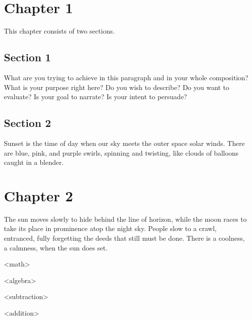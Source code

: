 \chapter{Chapter 1}
\label{chapter:1}
This chapter consists of two sections.

\section{Section 1}
\label{section:1}

What are you trying to achieve in this paragraph and in your whole composition? What is your purpose right here? Do you wish to describe? Do you want to evaluate? Is your goal to narrate? Is your intent to persuade?

\section{Section 2}
\label{section:2}

Sunset is the time of day when our sky meets the outer space solar winds. There are blue, pink, and purple swirls, spinning and twisting, like clouds of balloons caught in a blender.


\chapter{Chapter 2}
The sun moves slowly to hide behind the line of horizon, while the moon races to take its place in prominence atop the night sky. People slow to a crawl, entranced, fully forgetting the deeds that still must be done. There is a coolness, a calmness, when the sun does set.

\begin{concepthierarchy}
    \begin{concept}<math>
    \label{c1}
        \begin{concept}<algebra>
        \label{c11}
        \end{concept}
        \begin{concept}<subtraction>
        \label{c12}
        \end{concept}
    \end{concept}
    \begin{concept}<addition>
    \end{concept}
\end{concepthierarchy}
